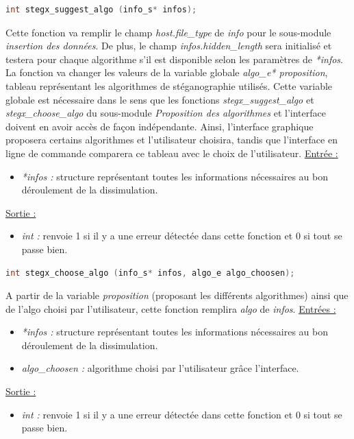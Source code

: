 \documentclass[11pt]{article}
\begin{document}
\begin{lstlisting}[language=c]
int stegx_suggest_algo (info_s* infos);
\end{lstlisting}

Cette fonction va remplir le champ \textit{host.file\_type} 
de \textit{info} pour le sous-module \textit{insertion des données}. 
De plus, le champ \textit{infos.hidden\_length} sera initialisé et testera 
pour chaque algorithme s'il est disponible selon les paramètres de \textit{*infos}. 
La fonction va changer les valeurs de la variable globale \textit{algo\_e* proposition}, 
tableau représentant les algorithmes de stéganographie utilisés. 
Cette variable globale est nécessaire dans le sens que les fonctions 
\textit{stegx\_suggest\_algo} et \textit{stegx\_choose\_algo} du sous-module 
\textit{Proposition des algorithmes} et l'interface doivent en avoir accès de 
façon indépendante. 
Ainsi, l'interface graphique proposera certains algorithmes et l'utilisateur 
choisira, tandis que l'interface en ligne de commande comparera ce tableau 
avec le choix de l'utilisateur. 
\newline
\underline{Entrée :}
\begin{itemize}
\item \textit{*infos :} structure représentant toutes les informations 
nécessaires au bon déroulement de la dissimulation. 
\end{itemize}
\underline{Sortie :} 
\begin{itemize}
\item \textit{int :} renvoie 1 si il y a une erreur détectée dans cette 
fonction et 0 si tout se passe bien. 
\newline 
\end{itemize}

\begin{lstlisting}[language=c]
int stegx_choose_algo (info_s* infos, algo_e algo_choosen); 
\end{lstlisting}

A partir de la variable \textit{proposition} (proposant les différents algorithmes)
ainsi que de l'algo choisi par l'utilisateur, cette fonction remplira 
\textit{algo} de \textit{infos}. 
\newline
\underline{Entrées :}
\begin{itemize}
\item \textit{*infos :} structure représentant toutes les informations 
nécessaires au bon déroulement de la dissimulation. 
\item \textit{algo\_choosen :} algorithme choisi par l'utilisateur grâce
l'interface.
\end{itemize}
\underline{Sortie :} 
\begin{itemize}
\item \textit{int :} renvoie 1 si il y a une erreur détectée dans cette 
fonction et 0 si tout se passe bien.  
\newline 
\end{itemize}
\end{document}

